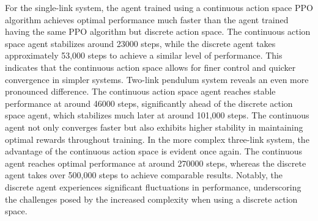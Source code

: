 For the single-link system, the agent trained using a continuous action space PPO algorithm achieves optimal performance much faster than the agent trained having the same PPO algorithm but discrete action space. The continuous action space agent stabilizes around 23000 steps, while the discrete agent takes approximately 53,000 steps to achieve a similar level of performance. This indicates that the continuous action space allows for finer control and quicker convergence in simpler systems. 
Two-link pendulum system reveals an even more pronounced difference. The continuous action space agent reaches stable performance at around 46000 steps, significantly ahead of the discrete action space agent, which stabilizes much later at around 101,000 steps. The continuous agent not only converges faster but also exhibits higher stability in maintaining optimal rewards throughout training. 
In the more complex three-link system, the advantage of the continuous action space is evident once again. The continuous agent reaches optimal performance at around 270000 steps, whereas the discrete agent takes over 500,000 steps to achieve comparable results. Notably, the discrete agent experiences significant fluctuations in performance, underscoring the challenges posed by the increased complexity when using a discrete action space.

